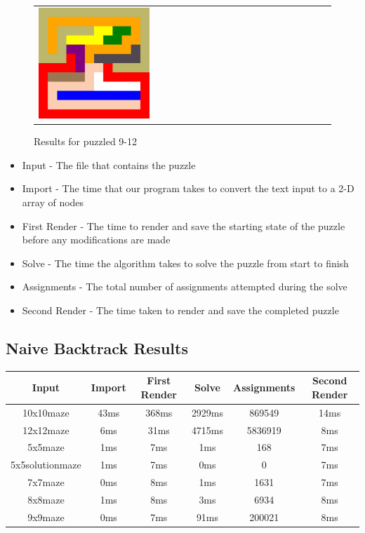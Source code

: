 \documentclass{article}
\begin{document}
\begin{figure}
\begin{tabularx}{\textwidth}{X X}
		\includegraphics[width=0.4\textwidth]{12x12_output.png} \\
	\end{tabularx}
	\caption{Results for puzzled 9-12}
	\label{fig:resultsB}
\end{figure}
            
    
    \begin{itemize}
        \item Input - The file that contains the puzzle
        \item Import - The time that our program takes to convert the text input to a 2-D array of nodes
        \item First Render - The time to render and save the starting state of the puzzle before any modifications are made
        \item Solve - The time the algorithm takes to solve the puzzle from start to finish
        \item Assignments - The total number of assignments attempted during the solve
        \item Second Render - The time taken to render and save the completed puzzle
    \end{itemize}

\subsection{Naive Backtrack Results}
    \begin{tabular}{c c c c c c}
        Input & Import & First Render & Solve & Assignments & Second Render \\
        \hline
        10x10maze & 43ms & 368ms & 2929ms & 869549 & 14ms \\
        12x12maze & 6ms & 31ms & 4715ms & 5836919 & 8ms \\
        5x5maze & 1ms & 7ms & 1ms & 168 & 7ms \\
        5x5solutionmaze & 1ms & 7ms & 0ms & 0 & 7ms \\
        7x7maze & 0ms & 8ms & 1ms & 1631 & 7ms \\
        8x8maze & 1ms & 8ms & 3ms & 6934 & 8ms \\
        9x9maze & 0ms & 7ms & 91ms & 200021 & 8ms \\
    \end{tabular}   
\end{document}
